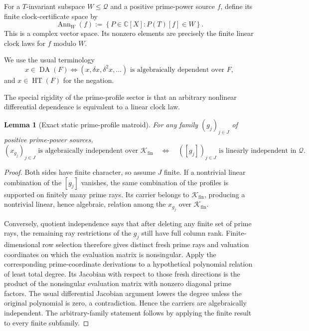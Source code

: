 \documentclass[11pt]{article}
\newtheorem{lemma}[theorem]{Lemma}
\theoremstyle{definition}
\theoremstyle{remark}
\newcommand{\C}{\mathbb C}
\newcommand{\Kfin}{\mathcal K_{\mathrm{fin}}}
\newcommand{\Q}{\mathcal Q}
\newcommand{\DA}{\operatorname{DA}}
\newcommand{\HT}{\operatorname{HT}}
\newcommand{\Ann}{\operatorname{Ann}}
\begin{document}
For a $T$-invariant subspace $W\leq\Q$ and a positive prime-power source $f$, define its finite
clock-certificate space by
\[
  \Ann_W(f):=
  \left\{P\in\C[X]:P(T)[f]\in W\right\}.                       \tag{4.1}
\]
This is a complex vector space.  Its nonzero elements are precisely the finite linear clock laws
for $f$ modulo $W$.

We use the usual terminology
\[
  x\in\DA(F)
  \Longleftrightarrow
  (x,\delta x,\delta^2x,\ldots)
  \text{ is algebraically dependent over }F,                   \tag{4.2}
\]
and $x\in\HT(F)$ for the negation.

The special rigidity of the prime-profile sector is that an arbitrary nonlinear differential
dependence is equivalent to a linear clock law.

\begin{lemma}[Exact static prime-profile matroid]\label{lem:static-matroid}
For any family $(g_j)_{j\in J}$ of positive prime-power sources,
\[
  (x_{g_j})_{j\in J}\text{ is algebraically independent over }\Kfin
  \quad\Longleftrightarrow\quad
  ([g_j])_{j\in J}\text{ is linearly independent in }\Q.       \tag{4.3}
\]
\end{lemma}

\begin{proof}
Both sides have finite character, so assume $J$ finite.  If a nontrivial linear combination of the
$[g_j]$ vanishes, the same combination of the profiles is supported on finitely many prime rays.
Its carrier belongs to $\Kfin$, producing a nontrivial linear, hence algebraic, relation among the
$x_{g_j}$ over $\Kfin$.

Conversely, quotient independence says that after deleting any finite set of prime rays, the
remaining ray restrictions of the $g_j$ still have full column rank.  Finite-dimensional row
selection therefore gives distinct fresh prime rays and valuation coordinates on which the
evaluation matrix is nonsingular.  Apply the corresponding prime-coordinate derivations to a
hypothetical polynomial relation of least total degree.  Its Jacobian with respect to those fresh
directions is the product of the nonsingular evaluation matrix with nonzero diagonal prime
factors.  The usual differential Jacobian argument lowers the degree unless the original
polynomial is zero, a contradiction.  Hence the carriers are algebraically independent.  The
arbitrary-family statement follows by applying the finite result to every finite subfamily.
\end{proof}
\end{document}
